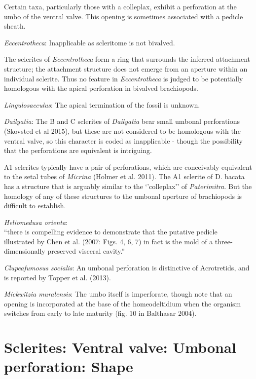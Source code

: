 \documentclass[]{book}
\theoremstyle{definition}
\theoremstyle{definition}
\theoremstyle{definition}
\theoremstyle{remark}
\begin{document}
Certain taxa, particularly those with a colleplax, exhibit a perforation
at the umbo of the ventral valve. This opening is sometimes associated
with a pedicle sheath.

\emph{Eccentrotheca}: Inapplicable as scleritome is not bivalved.

The sclerites of \emph{Eccentrotheca} form a ring that surrounds the
inferred attachment structure; the attachment structure does not emerge
from an aperture within an individual sclerite. Thus no feature in
\emph{Eccentrotheca} is judged to be potentially homologous with the
apical perforation in bivalved brachiopods.

\emph{Lingulosacculus}: The apical termination of the fossil is unknown.

\emph{Dailyatia}: The B and C sclerites of \emph{Dailyatia} bear small
umbonal perforations (Skovsted et al 2015), but these are not considered
to be homologous with the ventral valve, so this character is coded as
inapplicable - though the possibility that the perforations are
equivalent is intriguing.

A1 sclerites typically have a pair of perforations, which are
conceivably equivalent to the setal tubes of \emph{Micrina} (Holmer et
al. 2011). The A1 sclerite of D. bacata has a structure that is arguably
similar to the `'colleplax'' of \emph{Paterimitra}. But the homology of
any of these structures to the umbonal aperture of brachiopods is
difficult to establish.

\emph{Heliomedusa orienta}:\\
``there is compelling evidence to demonstrate that the putative
pedicle\\
illustrated by Chen et al. (2007: Figs. 4, 6, 7) in fact is the mold of
a three-dimensionally preserved visceral cavity.''

\emph{Clupeafumosus socialis}: An umbonal perforation is distinctive of
Acrotretids, and is reported by Topper et al. (2013).

\emph{Mickwitzia muralensis}: The umbo itself is imperforate, though
note that an opening is incorporated at the base of the homeodeltidium
when the organism switches from early to late maturity (fig. 10 in
Balthasar 2004).

\hypertarget{sclerites-ventral-valve-umbonal-perforation-shape}{%
\section*{Sclerites: Ventral valve: Umbonal perforation:
Shape}\label{sclerites-ventral-valve-umbonal-perforation-shape}}
\end{document}
